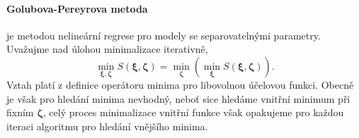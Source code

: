 \paragraph{Golubova-Pereyrova metoda} je metodou nelineární regrese pro modely se separovatelnými parametry. Uvažujme nad úlohou minimalizace iterativně, 
\begin{equation}\label{eq:minimum_composition_property}
    \min_{\bm{\xi}, \bm{\zeta}}S(\bm{\xi}, \bm{\zeta})=\min_{\bm{\zeta}}\left(\min_{\bm{\xi}}S(\bm{\xi},\bm{\zeta})\right).
\end{equation}
Vztah platí z definice operátoru minima pro libovolnou účelovou funkci. Obecně je však pro hledání minima nevhodný, neboť sice hledáme vnitřní minimum při fixním $\bm{\zeta}$, celý proces minimalizace vnitřní funkce však opakujeme pro každou iteraci algoritmu pro hledání vnějšího minima.

